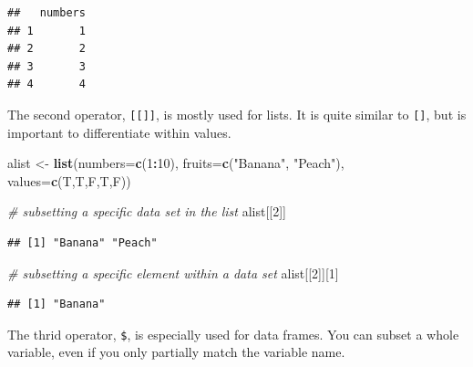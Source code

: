\documentclass[]{report}
\newenvironment{Shaded}{\begin{snugshade}}{\end{snugshade}}
\newcommand{\KeywordTok}[1]{\textcolor[rgb]{0.13,0.29,0.53}{\textbf{#1}}}
\newcommand{\DataTypeTok}[1]{\textcolor[rgb]{0.13,0.29,0.53}{#1}}
\newcommand{\DecValTok}[1]{\textcolor[rgb]{0.00,0.00,0.81}{#1}}
\newcommand{\StringTok}[1]{\textcolor[rgb]{0.31,0.60,0.02}{#1}}
\newcommand{\CommentTok}[1]{\textcolor[rgb]{0.56,0.35,0.01}{\textit{#1}}}
\newcommand{\OperatorTok}[1]{\textcolor[rgb]{0.81,0.36,0.00}{\textbf{#1}}}
\newcommand{\NormalTok}[1]{#1}
\begin{document}
\begin{verbatim}
##   numbers
## 1       1
## 2       2
## 3       3
## 4       4
\end{verbatim}

The second operator, \texttt{{[}{[}{]}{]}}, is mostly used for lists. It
is quite similar to \texttt{{[}{]}}, but is important to differentiate
within values.

\begin{Shaded}
\begin{Highlighting}[]
\NormalTok{alist <-}\StringTok{ }\KeywordTok{list}\NormalTok{(}\DataTypeTok{numbers=}\KeywordTok{c}\NormalTok{(}\DecValTok{1}\OperatorTok{:}\DecValTok{10}\NormalTok{),}
      \DataTypeTok{fruits=}\KeywordTok{c}\NormalTok{(}\StringTok{"Banana"}\NormalTok{, }\StringTok{"Peach"}\NormalTok{),}
      \DataTypeTok{values=}\KeywordTok{c}\NormalTok{(T,T,F,T,F))}

\CommentTok{# subsetting a specific data set in the list}
\NormalTok{alist[[}\DecValTok{2}\NormalTok{]]}
\end{Highlighting}
\end{Shaded}

\begin{verbatim}
## [1] "Banana" "Peach"
\end{verbatim}

\begin{Shaded}
\begin{Highlighting}[]
\CommentTok{# subsetting a specific element within a data set}
\NormalTok{alist[[}\DecValTok{2}\NormalTok{]][}\DecValTok{1}\NormalTok{]}
\end{Highlighting}
\end{Shaded}

\begin{verbatim}
## [1] "Banana"
\end{verbatim}

The thrid operator, \texttt{\$}, is especially used for data frames. You
can subset a whole variable, even if you only partially match the
variable name.

\begin{Shaded}
\end{Shaded}
\end{document}
